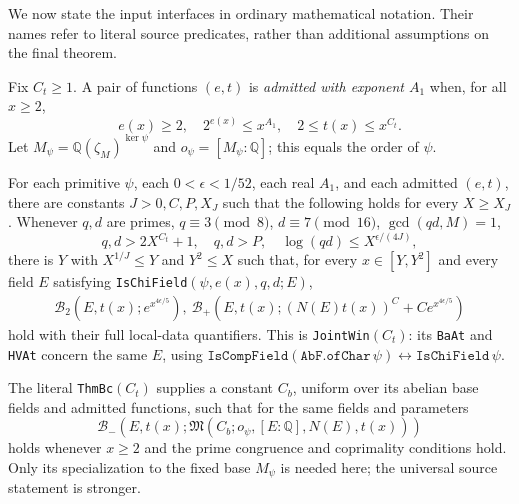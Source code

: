 We now state the input interfaces in ordinary mathematical notation.
Their names refer to literal source predicates, rather than additional
assumptions on the final theorem.

Fix $C_t\ge1$.  A pair of functions $(e,t)$ is \emph{admitted with
exponent $A_1$} when, for all $x\ge2$,
\[
 e(x)\ge2,\quad 2^{e(x)}\le x^{A_1},\quad
                   2\le t(x)\le x^{C_t}.
\]
Let $M_\psi=\mathbb Q(\zeta_M)^{\ker\psi}$ and
$o_\psi=[M_\psi:\mathbb Q]$; this equals the order of $\psi$.

\begin{description}[style=nextline,leftmargin=0pt,labelwidth=0pt,labelsep=0pt]
\item[Joint window input $\mathsf J(C_t)$.]
For each primitive $\psi$, each $0<\epsilon<1/52$, each real $A_1$,
and each admitted $(e,t)$, there are constants
$J>0,C,P,X_J$ such that the following holds for every $X\ge X_J$.
Whenever $q,d$ are primes, $q\equiv3\pmod8$, $d\equiv7\pmod{16}$,
$\gcd(qd,M)=1$,
\[
 q,d>2X^{C_t}+1,\quad q,d>P,\quad
                  \log(qd)\le X^{\epsilon/(4J)},
\]
there is $Y$ with $X^{1/J}\le Y$ and $Y^2\le X$ such that,
for every $x\in[Y,Y^2]$ and every field $E$ satisfying
\texttt{IsChiField}$(\psi,e(x),q,d;E)$,
\[
 \begin{split}
 \mathcal B_2(E,t(x);e^{x^{4\epsilon/5}}),\
 \mathcal B_+(E,t(x);(N(E)t(x))^C+Ce^{x^{4\epsilon/5}})
 \end{split}
 \tag{VW.16}
\]
hold with their full local-data quantifiers.  This is
\texttt{JointWin}$(C_t)$: its \texttt{BaAt} and \texttt{HVAt} concern
the same $E$, using
$\texttt{IsCompField}(\texttt{AbF.ofChar}\,\psi)\leftrightarrow
\texttt{IsChiField}\,\psi$.

\item[Odd-minus input $\mathsf M(C_t)$.]
The literal \texttt{ThmBc}$(C_t)$ supplies a constant $C_b$,
uniform over its abelian base fields and admitted functions, such that
for the same fields and parameters
\[
 \mathcal B_-(E,t(x);
       \mathfrak M(C_b;o_\psi,[E:\mathbb Q],N(E),t(x)))
 \tag{VW.17}
\]
holds whenever $x\ge2$ and the prime congruence and coprimality
conditions hold.  Only its specialization to the fixed base $M_\psi$
is needed here; the universal source statement is stronger.
\end{description}

